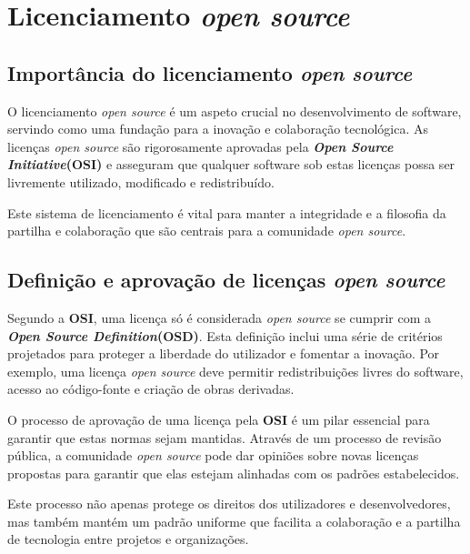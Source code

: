 \section{Licenciamento \textit{open source}} \label{section: licenciamento}
\subsection{Importância do licenciamento \textit{open source}}
O licenciamento \textit{open source} é um aspeto crucial no desenvolvimento de software, servindo como uma fundação para a inovação e colaboração tecnológica.
As licenças \textit{open source} são rigorosamente aprovadas pela \textbf{\textit{Open Source Initiative}(OSI)} e asseguram que qualquer software sob estas licenças possa ser livremente utilizado, modificado e redistribuído.
\par \vspace{6pt}
Este sistema de licenciamento é vital para manter a integridade e a filosofia da partilha e colaboração que são centrais para a comunidade \textit{open source}.

\subsection{Definição e aprovação de licenças \textit{open source}}
Segundo a \textbf{OSI}, uma licença só é considerada \textit{open source} se cumprir com a \textbf{\textit{Open Source Definition}(OSD)}. Esta definição inclui uma série de critérios projetados para proteger a liberdade do
utilizador e fomentar a inovação. Por exemplo, uma licença \textit{open source} deve permitir redistribuições livres do software, acesso ao código-fonte e criação de obras derivadas.
\par \vspace{6pt}
O processo de aprovação de uma licença pela \textbf{OSI} é um pilar essencial para garantir que estas normas sejam mantidas. Através de um processo de revisão pública, a comunidade \textit{open source} pode dar opiniões 
sobre novas licenças propostas para garantir que elas estejam alinhadas com os padrões estabelecidos. 
\par \vspace{6pt}
Este processo não apenas protege os direitos dos utilizadores e desenvolvedores, mas também mantém um 
padrão uniforme que facilita a colaboração e a partilha de tecnologia entre projetos e organizações.

